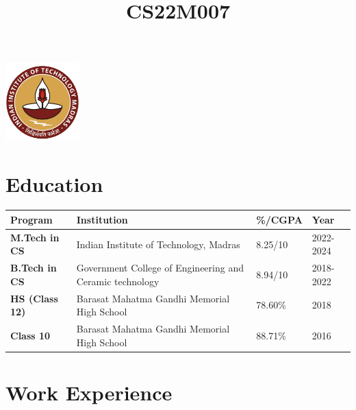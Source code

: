 \documentclass[10pt,a4paper]{moderncv}        %
\title{CS22M007}
\begin{document}
\hypersetup{
    linkcolor=blue,
    filecolor=magenta,      
    urlcolor=cyan,
}

\noindent
\begin{minipage}{.78\textwidth}
\makecvtitle

\end{minipage}%
\begin{minipage}{.30\textwidth}
  \centering
  \includegraphics[height=3cm]{iitm.png}
\end{minipage}
\vspace{-1em}

\section{Education}
\begin{minipage}{\textwidth}
\centering
\setlength{\tabcolsep}{10pt}
\begin{tabular}{|p{3cm}|p{8cm}|p{2cm}|p{3cm}|}
\hline
\textbf{Program} & \textbf{Institution} & \textbf{\%/CGPA} & \textbf{Year} \\ \hline
\textbf{M.Tech in CS} & Indian Institute of Technology, Madras & 8.25/10 & 2022-2024 \\ \hline
\textbf{B.Tech in CS} & Government College of Engineering and Ceramic technology & 8.94/10 & 2018-2022 \\ \hline
\textbf{HS (Class 12)} & Barasat Mahatma Gandhi Memorial High School & 78.60\% & 2018 \\\hline
\textbf{Class 10} & Barasat Mahatma Gandhi Memorial High School & 88.71\% & 2016 \\
\hline
\end{tabular}

\end{minipage}

\vspace{1em}
\section{Work Experience}
\cvlistitem{}
\end{document}

